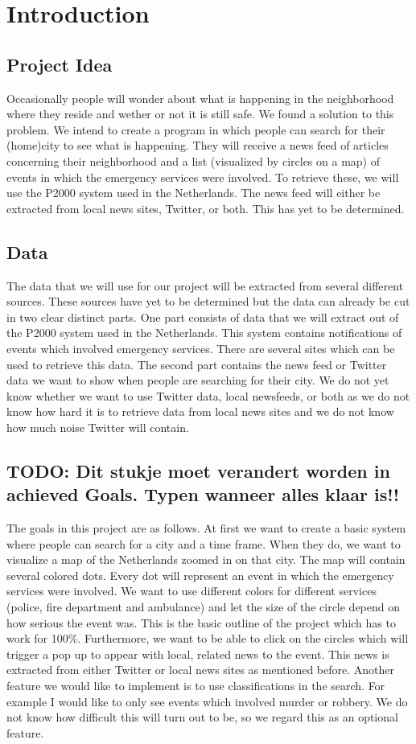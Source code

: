 \section{Introduction}
\subsection*{Project Idea}
Occasionally people will wonder about what is happening in the neighborhood where they reside and wether or not it is still safe.
We found a solution to this problem. We intend to create a program in which people can search for their (home)city to see what is happening. They will receive a news feed of articles concerning their neighborhood and a list (visualized by circles on a map) of events in which the emergency services were involved. To retrieve these, we will use the P2000 system used in the Netherlands. The news feed will either be extracted from local news sites, Twitter, or both. This has yet to be determined.

\subsection*{Data}
The data that we will use for our project will be extracted from several different sources. 
These sources have yet to be determined but the data can already be cut in two clear distinct parts. 
One part consists of data that we will extract out of the P2000 system used in the Netherlands. 
This system contains notifications of events which involved emergency services. 
There are several sites which can be used to retrieve this data.
The second part contains the news feed or Twitter data we want to show when people are searching for their city. 
We do not yet know whether we want to use Twitter data, local newsfeeds, or both as we do not know how hard it is to retrieve data from local news sites and we do not know how much noise Twitter will contain.

\subsection*{TODO: Dit stukje moet verandert worden in achieved Goals. Typen wanneer alles klaar is!!}
The goals in this project are as follows. 
At first we want to create a basic system where people can search for a city and a time frame. 
When they do, we want to visualize a map of the Netherlands zoomed in on that city. 
The map will contain several colored dots. 
Every dot will represent an event in which the emergency services were involved. 
We want to use different colors for different services (police, fire department and ambulance) and let the size of the circle depend on how serious the event was. This is the basic outline of the project which has to work for 100$\%$. Furthermore, we want to be able to click on the circles which will trigger a pop up to appear with local, related news to the event. This news is extracted from either Twitter or local news sites as mentioned before. Another feature we would like to implement is to use classifications in the search. For example I would like to only see events which involved murder or robbery. We do not know how difficult this will turn out to be, so we regard this as an optional feature.
